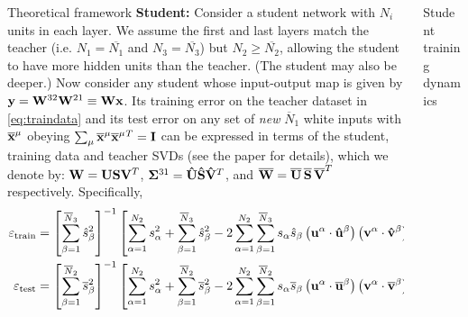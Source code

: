 \documentclass[final]{beamer}
\newcommand{\bb}[1]{{\bf\overline{#1}}}
\newcommand{\bh}[1]{{\bf\hat{#1}}}
\newcommand{\trainerr}{\mathcal{\varepsilon}_\text{train}}
\newcommand{\generr}{\mathcal{\varepsilon}_\text{test}}
\begin{document}
\begin{frame}[t]{}
\begin{columns}
\begin{column}[t]{0.248\textwidth}
\begin{block}{\large Theoretical framework}
\textbf{Student:} Consider a student network with \(N_i\) units in each layer. We assume the first and last layers match the teacher (i.e. \(N_1 = \overline{N_1}\) and \(N_3 = \overline{N_3}\)) but \(N_2 \geq \overline{N_2}\), allowing the student to have more hidden units than the teacher. (The student may also be deeper.) Now consider any student whose input-output map is given by \({\bf y} = {\bf W}^{32} {\bf W}^{21} \equiv {\bf Wx}\). Its training error on the teacher dataset in \eqref{eq:traindata} and its test error on any set of {\it new} \(\overline{N}_1 \) white inputs with \({\bb{x}}^\mu\) obeying \(\sum_{\mu} {\bb{x}}^\mu {\bb{x}}^\mu{}^T = {\bf I}\) can be expressed in terms of the student, training data and teacher SVDs (see the paper for details), which we denote by: 
\({\bf W} = {\bf U}{\bf S}{\bf V}^T \),  
\({\bf \Sigma}^{31} = {\bh U}{\bh S}{\bh V}^T \), and 
\(\bb{W} = \bb{U}\, \bb{S}\,\bb{V}^T\) respectively. Specifically,
\begin{align}
\trainerr &= \left[\sum_{\beta=1}^{\overline{N}_3} \hat{s}_{\beta}^2\right]^{-1} 
\left[ \sum_{\alpha=1}^{N_2} s_{\alpha}^2 +  \sum_{\beta=1}^{\overline{N}_3} \hat{s}_{\beta}^2
- 2 \sum_{\alpha=1}^{N_2} \sum_{\beta=1}^{\overline{N}_3}  s_{\alpha} \hat{s}_{\beta} \left({\bf u}^{\alpha} \cdot \bf{\hat u}^{\beta} \right) \left({\bf v}^{\alpha} \cdot \bf{\hat v}^{\beta} \right)\right] \label{eq:trainerr}\\
\generr &= \left[\sum_{\beta=1}^{\overline{N}_2} \overline{s}_{\beta}^2\right]^{-1} 
\left[ \sum_{\alpha=1}^{N_2} s_{\alpha}^2 +  \sum_{\beta=1}^{\overline{N}_2} \overline{s}_{\beta}^2
- 2 \sum_{\alpha=1}^{N_2} \sum_{\beta=1}^{\overline{N}_2}  s_{\alpha} \overline{s}_{\beta} \left({\bf u}^{\alpha} \cdot \bb{u}^{\beta} \right) \left({\bf v}^{\alpha} \cdot \bb{v}^{\beta} \right)\right] \label{eq:generr}
\end{align}
\end{block}
\end{column}
\begin{column}[t]{0.248\textwidth}
\begin{block}{\large Student training dynamics}
\begin{figure}[H]
\vspace{-0.5em}
\centering
\begin{subfigure}[t]{0.35\textwidth}
\texttt{[image: ../../plots/paper/fig\_1a.png]}
\label{s_of_t_a}
\end{subfigure}~
\begin{subfigure}[t]{0.35\textwidth}

\end{subfigure}
\end{figure}
\end{block}
\end{column}
\end{columns}
\end{frame}
\end{document}
